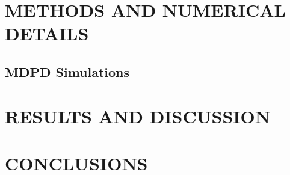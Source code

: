 \documentclass[journal=jacsat,manuscript=article]{achemso}
\begin{document}
\section{METHODS AND NUMERICAL DETAILS}
\subsection{MDPD Simulations}


\section{RESULTS AND DISCUSSION}

\section{CONCLUSIONS}

\clearpage




%
\end{document}
